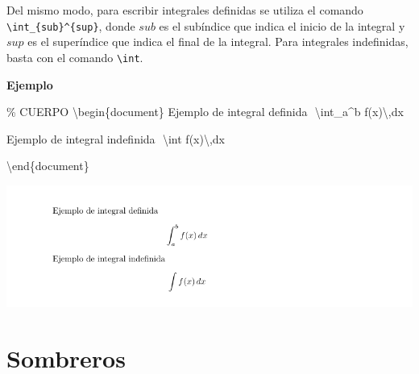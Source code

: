 \documentclass[
  letterpaper,
  DIV=11,
  numbers=noendperiod]{scrreport}
\newenvironment{Shaded}{\begin{snugshade}}{\end{snugshade}}
\newcommand{\CommentTok}[1]{\textcolor[rgb]{0.37,0.37,0.37}{#1}}
\newcommand{\ExtensionTok}[1]{\textcolor[rgb]{0.00,0.23,0.31}{#1}}
\newcommand{\KeywordTok}[1]{\textcolor[rgb]{0.00,0.23,0.31}{#1}}
\newcommand{\NormalTok}[1]{\textcolor[rgb]{0.00,0.23,0.31}{#1}}
\newcommand{\SpecialCharTok}[1]{\textcolor[rgb]{0.37,0.37,0.37}{#1}}
\newcommand{\SpecialStringTok}[1]{\textcolor[rgb]{0.13,0.47,0.30}{#1}}
\begin{document}
Del mismo modo, para escribir integrales definidas se utiliza el comando
\texttt{\textbackslash{}int\_\{sub\}\^{}\{sup\}}, donde \(sub\) es el
subíndice que indica el inicio de la integral y \(sup\) es el
superíndice que indica el final de la integral. Para integrales
indefinidas, basta con el comando \texttt{\textbackslash{}int}.

\textbf{Ejemplo}

\begin{Shaded}
\begin{Highlighting}[]
\CommentTok{\% CUERPO}
\KeywordTok{\textbackslash{}begin}\NormalTok{\{}\ExtensionTok{document}\NormalTok{\}}
\NormalTok{Ejemplo de integral definida}
\SpecialStringTok{$$}
\SpecialCharTok{\textbackslash{}int}\SpecialStringTok{\_a\^{}b f(x)}\SpecialCharTok{\textbackslash{},}\SpecialStringTok{dx}
\SpecialStringTok{$$}




\NormalTok{Ejemplo de integral indefinida}
\SpecialStringTok{$$}
\SpecialCharTok{\textbackslash{}int}\SpecialStringTok{ f(x)}\SpecialCharTok{\textbackslash{},}\SpecialStringTok{dx}
\SpecialStringTok{$$}



\KeywordTok{\textbackslash{}end}\NormalTok{\{}\ExtensionTok{document}\NormalTok{\}}
\end{Highlighting}
\end{Shaded}

\begin{tcolorbox}[enhanced jigsaw, arc=.35mm, toprule=.15mm, opacitybacktitle=0.6, colback=white, coltitle=black, colbacktitle=quarto-callout-note-color!10!white, breakable, colframe=quarto-callout-note-color-frame, left=2mm, opacityback=0, bottomtitle=1mm, toptitle=1mm, titlerule=0mm, title={Salida}, bottomrule=.15mm, leftrule=.75mm, rightrule=.15mm]
\includegraphics{./img/formulas/integral.png}
\end{tcolorbox}

\hypertarget{sombreros}{%
\section{Sombreros}\label{sombreros}}
\end{document}
